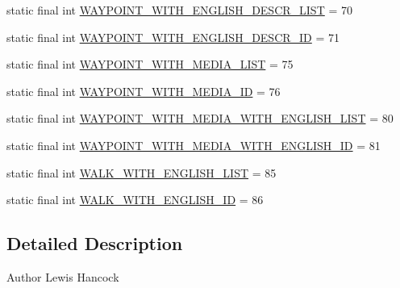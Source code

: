 \begin{DoxyCompactItemize}
\item 
static final int \hyperlink{classuk_1_1ac_1_1swan_1_1digitaltrails_1_1database_1_1_white_rock_content_provider_a7fa836afaf048defaa6d1c4fc43cdef7}{W\+A\+Y\+P\+O\+I\+N\+T\+\_\+\+W\+I\+T\+H\+\_\+\+E\+N\+G\+L\+I\+S\+H\+\_\+\+D\+E\+S\+C\+R\+\_\+\+L\+I\+S\+T} = 70
\item 
static final int \hyperlink{classuk_1_1ac_1_1swan_1_1digitaltrails_1_1database_1_1_white_rock_content_provider_a4f698a807b873cb5f9e177c45d8f8625}{W\+A\+Y\+P\+O\+I\+N\+T\+\_\+\+W\+I\+T\+H\+\_\+\+E\+N\+G\+L\+I\+S\+H\+\_\+\+D\+E\+S\+C\+R\+\_\+\+I\+D} = 71
\item 
static final int \hyperlink{classuk_1_1ac_1_1swan_1_1digitaltrails_1_1database_1_1_white_rock_content_provider_ade0c53c0073f048dab64cb43b6c0fb8d}{W\+A\+Y\+P\+O\+I\+N\+T\+\_\+\+W\+I\+T\+H\+\_\+\+M\+E\+D\+I\+A\+\_\+\+L\+I\+S\+T} = 75
\item 
static final int \hyperlink{classuk_1_1ac_1_1swan_1_1digitaltrails_1_1database_1_1_white_rock_content_provider_aa87220999a3c0ec3eba1aa7daf3c4bf8}{W\+A\+Y\+P\+O\+I\+N\+T\+\_\+\+W\+I\+T\+H\+\_\+\+M\+E\+D\+I\+A\+\_\+\+I\+D} = 76
\item 
static final int \hyperlink{classuk_1_1ac_1_1swan_1_1digitaltrails_1_1database_1_1_white_rock_content_provider_ac1485aa99035bd990dfe5c51724387d5}{W\+A\+Y\+P\+O\+I\+N\+T\+\_\+\+W\+I\+T\+H\+\_\+\+M\+E\+D\+I\+A\+\_\+\+W\+I\+T\+H\+\_\+\+E\+N\+G\+L\+I\+S\+H\+\_\+\+L\+I\+S\+T} = 80
\item 
static final int \hyperlink{classuk_1_1ac_1_1swan_1_1digitaltrails_1_1database_1_1_white_rock_content_provider_ae341a1383201b7d499a33d26aca9a0a7}{W\+A\+Y\+P\+O\+I\+N\+T\+\_\+\+W\+I\+T\+H\+\_\+\+M\+E\+D\+I\+A\+\_\+\+W\+I\+T\+H\+\_\+\+E\+N\+G\+L\+I\+S\+H\+\_\+\+I\+D} = 81
\item 
static final int \hyperlink{classuk_1_1ac_1_1swan_1_1digitaltrails_1_1database_1_1_white_rock_content_provider_a8f3993ad6021196aad2866d0707b43e2}{W\+A\+L\+K\+\_\+\+W\+I\+T\+H\+\_\+\+E\+N\+G\+L\+I\+S\+H\+\_\+\+L\+I\+S\+T} = 85
\item 
static final int \hyperlink{classuk_1_1ac_1_1swan_1_1digitaltrails_1_1database_1_1_white_rock_content_provider_a861a3dfaefbc5249d86d1992764f4317}{W\+A\+L\+K\+\_\+\+W\+I\+T\+H\+\_\+\+E\+N\+G\+L\+I\+S\+H\+\_\+\+I\+D} = 86
\end{DoxyCompactItemize}


\subsection{Detailed Description}
\begin{DoxyAuthor}{Author}
Lewis Hancock 
\end{DoxyAuthor}


